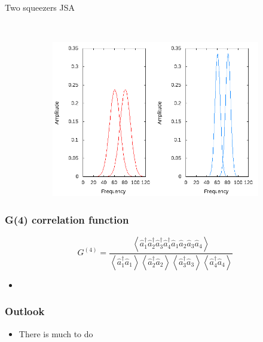 \documentclass{beamer}
\renewcommand{\annia}{\hat{a}}
\renewcommand{\creata}{\hat{a}^\dagger}
\begin{document}
\begin{frame}{Two  squeezers JSA} 
    \begin{figure}
        \centering
        \begin{subfigure}{0.45\textwidth}
        \end{subfigure}
        ~
        \begin{subfigure}{0.45\textwidth}
        \includegraphics[width=1\textwidth]{single_sig_idler12.png}
    \end{subfigure}
   \end{figure}

\end{frame} 

\begin{frame}
    \frametitle{G(4) correlation function}
    \begin{equation}
        G^{(4)} = \frac{ \left< \creata_1 \creata_2 \creata_3 \creata_4 \annia_1 \annia_2 \annia_3 \annia_4 \right>}
        {\left< \creata_1 \annia_1 \right> \left< \creata_2 \annia_2 \right> \left< \creata_3 \annia_3 \right> \left< \creata_4 \annia_4 \right>}
    \end{equation}
  
    \begin{figure}[h]
    \end{figure}
    \begin{itemize}
	\item   
\end{itemize}
\end{frame}

\begin{frame}
\frametitle{Outlook}
\begin{itemize}
    \item There is much to do
\end{itemize}
\end{frame}
\end{document}
